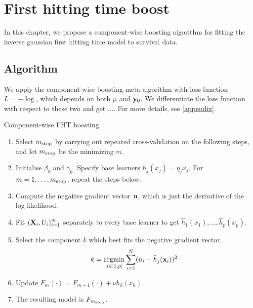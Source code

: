\chapter{First hitting time boost}
In this chapter, we propose a component-wise boosting algorithm for fitting the inverse gaussian first hitting time model to survival data.

\section{Algorithm}
We apply the component-wise boosting meta-algorithm with loss function $L=-\log$, which depends on both $\mu$ and $\mathbf{y}_0$. We differentiate the loss function with respect to these two and get .... For more details, see \ref{appendix}.

\begin{algorithm}
\caption{Component-wise FHT boosting}
\label{algo:fhtboost}
\begin{enumerate}
    \item Select $m_{\text{stop}}$ by carrying out repeated cross-validation on the following steps, and let $m_{\text{stop}}$ be the minimizing $m$.
    \item Initialise $\beta_0$ and $\gamma_0$. Specify base learners $h_j(x_j)=\eta_jx_j$. For $m=1,\ldots,m_{\text{stop}}$, repeat the steps below.
    \item Compute the negative gradient vector $\mathbf{u}$, which is just the derivative of the log likelihood.
    \item Fit $(\mathbf{X}_i,U_i)_{i=1}^N$ separately to every base learner to get $\hat{h}_1(x_1),\dotsc,\hat{h}_p(x_p)$.
    \item Select the component $k$ which best fits the negative gradient vector.
        \begin{equation*}
            k=\operatorname*{argmin}_{j\in[1,p]}\sum_{i=1}^N(u_i-\hat{h}_j(\mathbf{x}_i))^2
        \end{equation*}
    \item Update $F_m(\cdot)=F_{m-1}(\cdot)+\nu h_k(x_k)$
    \item The resulting model is $F_{m_{\text{stop}}}$.
\end{enumerate}
\end{algorithm}
